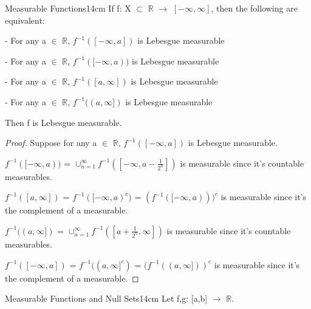     \newpage



    \begin{wtheorem}{Measurable Functions}{14cm}
        If f: X $\subset$ $\mathbb{R}$ $\rightarrow$ $[-\infty,\infty]$, then
        the following are equivalent:

        \hspace{0.5cm}
        - For any a $\in$ $\mathbb{R}$, $f^{-1}([-\infty,a])$
        is Lebesgue measurable

        \hspace{0.5cm}
        - For any a $\in$ $\mathbb{R}$, $f^{-1}([-\infty,a))$
        is Lebesgue measurable

        \hspace{0.5cm}
        - For any a $\in$ $\mathbb{R}$, $f^{-1}([a,\infty])$
        is Lebesgue measurable

        \hspace{0.5cm}
        - For any a $\in$ $\mathbb{R}$, $f^{-1}((a,\infty])$
        is Lebesgue measurable

        Then f is {\color{lblue} Lebesgue measurable}.
    \end{wtheorem}

    \begin{proof}
        Suppose for any a $\in$ $\mathbb{R}$, $f^{-1}([-\infty,a])$
        is Lebesgue measurable.

        $f^{-1}([-\infty,a))$
        = $\cup_{n=1}^{\infty} f^{-1}([-\infty,a-\frac{1}{2^n}])$
        is measurable since it's countable measurables. 

        $f^{-1}([a,\infty])$
        = $f^{-1}([-\infty,a)^c)$
        = $(f^{-1}([-\infty,a)))^c$
        is measurable since it's the complement of a measurable.

        $f^{-1}((a,\infty])$
        = $\cup_{n=1}^{\infty} f^{-1}([a+\frac{1}{2^n},\infty])$
        is measurable since it's countable measurables.

        $f^{-1}([-\infty,a])$
        = $f^{-1}((a,\infty]^c)$
        = $(f^{-1}((a,\infty]))^c$
        is measurable since it's the complement of a measurable.
    \end{proof}

    \vspace{0.5cm}



    \begin{wtheorem}{Measurable Functions and Null Sets}{14cm}
        Let f,g: [a,b] $\rightarrow$ $\mathbb{R}$.
    \end{wtheorem}

